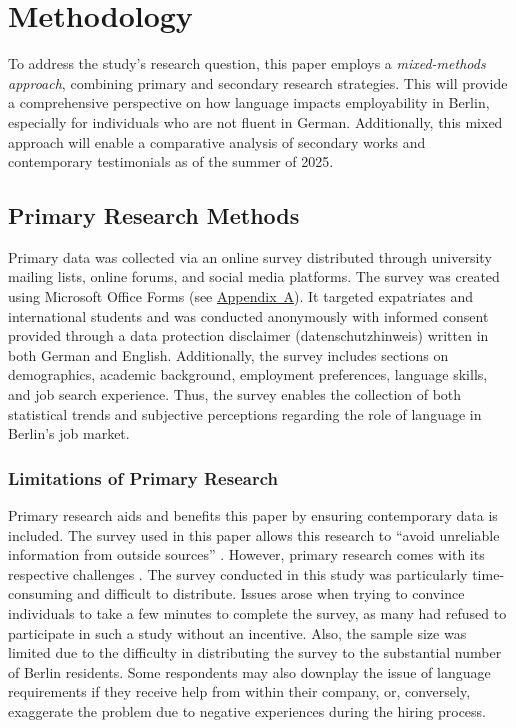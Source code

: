 \chapter{Methodology}
To address the study’s research question, this paper employs a \emph{mixed-methods approach}, combining primary and secondary research strategies. This will provide a comprehensive perspective on how language impacts employability in Berlin, especially for individuals who are not fluent in German. Additionally, this mixed approach will enable a comparative analysis of secondary works and contemporary testimonials as of the summer of 2025.

\section{Primary Research Methods}
Primary data was collected via an online survey distributed through university mailing lists, online forums, and social media platforms. The survey was created using Microsoft Office Forms (see \hyperref[appendix:A]{Appendix~A}). It targeted expatriates and international students and was conducted anonymously with informed consent provided through a data protection disclaimer (datenschutzhinweis) written in both German and English. Additionally, the survey includes sections on demographics, academic background, employment preferences, language skills, and job search experience. Thus, the survey enables the collection of both statistical trends and subjective perceptions regarding the role of language in Berlin’s job market.

\subsection{Limitations of Primary Research}
Primary research aids and benefits this paper by ensuring contemporary data is included. The survey used in this paper allows this research to “avoid unreliable information from outside sources” \citep{Indeed25}. However, primary research comes with its respective challenges \citep{k2024crucial}. The survey conducted in this study was particularly time-consuming and difficult to distribute. Issues arose when trying to convince individuals to take a few minutes to complete the survey, as many had refused to participate in such a study without an incentive. Also, the sample size was limited due to the difficulty in distributing the survey to the substantial number of Berlin residents. Some respondents may also downplay the issue of language requirements if they receive help from within their company, or, conversely, exaggerate the problem due to negative experiences during the hiring process.

